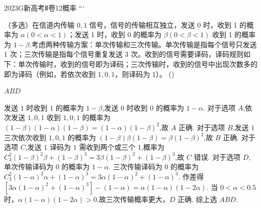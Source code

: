 \documentclass[12pt,UTF-8,a4paper]{ctexart}
\numberwithin{figure}{section}
\theoremstyle{mystyle}
\theoremstyle{mystylekaishu}
\theoremstyle{mystyle}
\numberwithin{xiti}{section}
\begin{document}
\begin{problem}{2023}{G}{新高考Ⅱ卷}{12}{概率}
```

（多选）在信道内传输 $0,1$ 信号，信号的传输相互独立，发送 0 时，收到 1 的概率为 $\alpha(0<\alpha<1)$；发送 1 时，收到 0 的概率为 $\beta(0<\beta<1)$ 收到 1 的概率为 $1-\beta$.考虑两种传输方案：单次传输和三次传输。单次传输是指每个信号只发送 1 次；三次传输是指每个信号重复发送 3 次。收到的信号需要译码，译码规则如下：单次传输时，收到的信号即为译码；三次传输时，收到的信号中出现次数多的即为译码（例如，若依次收到 $1,0,1$，则译码为 1）。 (\hspace{1cm})
\begin{choices}
\end{choices}
\end{problem}

\begin{answer}
$ABD$
\end{answer}

\begin{solutions}
发送 $1$ 时收到 $1$ 的概率为 $1-\beta$,发送 $0$ 时收到 $0$ 的概率为 $1-\alpha$.
对于选项 $A$,依次发送 $1,0,1$ 收到 $1,0,1$ 的概率为 $(1-\beta)(1-\alpha)(1-\beta)=(1-\alpha)(1-\beta)^{2}$,故 $A$ 正确.
对于选项 $B$,发送 $1$ 三次依次收到 $1,0,1$ 的概率为 $(1-\beta)\beta(1-\beta)=\beta(1-\beta)^{2}$,故 $B$ 正确.
对于选项 $C$,发送 $1$ 译码为 $1$ 需收到两个或三个 $1$,概率为 $C_{3}^{2}(1-\beta)^{2}\beta+(1-\beta)^{3}=3\beta(1-\beta)^{2}+(1-\beta)^{3}$,故 $C$ 错误.
对于选项 $D$,单次传输译码为 $0$ 的概率为 $1-\alpha$. 三次传输译码为 $0$ 的概率为 $C_{3}^{2}(1-\alpha)^{2}\alpha+(1-\alpha)^{3}=3\alpha(1-\alpha)^{2}+(1-\alpha)^{3}$.
作差得 $[3\alpha(1-\alpha)^{2}+(1-\alpha)^{3}]-(1-\alpha)=\alpha(1-\alpha)(1-2\alpha)$.
当 $0<\alpha<0.5$ 时，$\alpha(1-\alpha)(1-2\alpha)>0$,故三次传输概率更大，$D$ 正确.
综上选 $ABD$.
\end{solutions}

\end{document}
